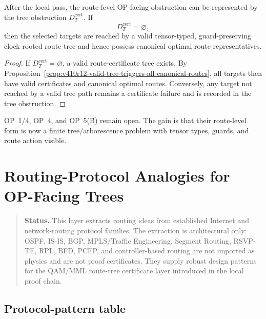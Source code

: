 \begin{theorem}
\label{thm:v410r12-op-facing-tree-reduction}
After the local pass, the route-level OP-facing obstruction can be represented by the
tree obstruction \(D_T^{\mathrm{cert}}\). If
\[
 D_T^{\mathrm{cert}}=\varnothing,
\]
then the selected targets are reached by a valid tensor-typed, guard-preserving
clock-rooted route tree and hence possess canonical optimal route
representatives.
\end{theorem}

\begin{proof}
If \(D_T^{\mathrm{cert}}=\varnothing\), a valid route-certificate tree exists.
By Proposition~\ref{prop:v410r12-valid-tree-triggers-all-canonical-routes}, all
targets then have valid certificates and canonical optimal routes. Conversely,
any target not reached by a valid tree path remains a certificate failure and is
recorded in the tree obstruction.
\end{proof}

\begin{remark}
\label{rem:v410r12-op-status}
OP~1/4, OP~4, and OP~5(B) remain open. The gain is that their route-level
form is now a finite tree/arborescence problem with tensor types, guards, and
route action visible.
\end{remark}



\clearpage
\section{Routing-Protocol Analogies for OP-Facing Trees}
\label{sec:v410r13-routing-protocol-analogies}

\begin{quote}\small
\noindent\textbf{Status.}
This layer extracts routing ideas from established Internet and network-routing
protocol families. The extraction is architectural only: OSPF, IS-IS, BGP,
MPLS/Traffic Engineering, Segment Routing, RSVP-TE, RPL, BFD, PCEP, and
controller-based routing are not imported as physics and are not proof
certificates. They supply robust design patterns for the QAM/MML route-tree
certificate layer introduced in the local proof chain.
\end{quote}

\subsection{Protocol-pattern table}
\label{subsec:v410r13-protocol-pattern-table}

